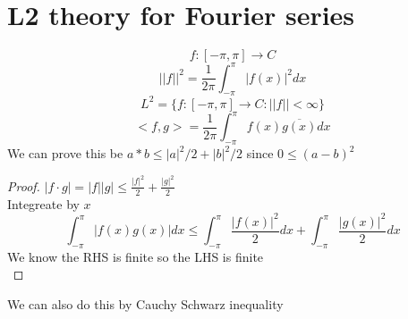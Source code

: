 \documentclass[answers,12pt,addpoints]{exam}
\begin{document}
\section{L2 theory for Fourier series}
$$f: [-\pi, \pi] \to C$$
$$|| f||^2 = \frac{1}{2\pi} \int_{-\pi}^{\pi} |f(x)|^2 dx$$
$$L^2 = \{ f: [-\pi, \pi] \to C: ||f|| < \infty\}$$
$$<f,g> = \frac{1}{2\pi} \int_{-\pi}^{\pi} f(x) \overline{g(x)} dx$$
We can prove this be $a*b \leq |a|^2 /2 + |b|^2 /2$ since $0 \leq (a-b)^2$
\begin{proof}
    $|f\cdot g| = |f||g| \leq \frac{|f|^2}{2} + \frac{|g|^2}{2}$\\
    Integreate by $x$\\
    $$\int_{-\pi}^{\pi} |f(x)g(x)| dx \leq \int_{-\pi}^{\pi} \frac{|f(x)|^2}{2} dx + \int_{-\pi}^{\pi} \frac{|g(x)|^2}{2} dx$$
    We know the RHS is finite so the LHS is finite\\
\end{proof}
We can also do this by Cauchy Schwarz inequality\\
\end{document}
